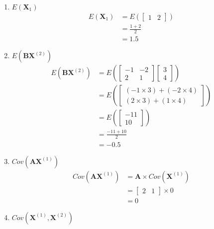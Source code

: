 \documentclass[12pt,a4paper]{paper}
\begin{document}
\begin{enumerate}
\begin{enumerate}
\item $E(\textbf{X}_{1})$
\begin{equation}
\begin{split}
E(\textbf{X}_{1}) &= E(\left[\begin{array}{cc}1 & 2\end{array}\right])\\
& = \frac{1 + 2}{2}\\
& = 1.5
\end{split}
\end{equation}
\item $E(\textbf{BX}^{(2)})$
\begin{equation}
\begin{split}
E(\textbf{BX}^{(2)}) &= E\left(\left[\begin{array}{cc}-1 & -2 \\ 2 & 1\end{array}\right]\left[\begin{array}{c}3 \\ 4\end{array}\right]\right)\\
& = E\left(\left[\begin{array}{c}(-1 \times 3) + (-2 \times 4) \\ (2 \times 3) + (1 \times 4)\end{array}\right]\right)\\
& = E\left(\left[\begin{array}{c}-11 \\ 10\end{array}\right]\right)\\
& = \frac{-11 + 10}{2}\\
& = -0.5
\end{split}
\end{equation}
\item $Cov(\textbf{AX}^{(1)})$
\begin{equation}
\begin{split}
Cov(\textbf{AX}^{(1)}) &= \textbf{A}\times Cov(\textbf{X}^{(1)})\\
&= \left[\begin{array}{cc}2 & 1\end{array}\right] \times 0\\
&= 0
\end{split}
\end{equation}
\item $Cov(\textbf{X}^{(1)},\textbf{X}^{(2)})$
\begin{equation}

\end{equation}
\end{enumerate}
\end{enumerate}
\end{document}
